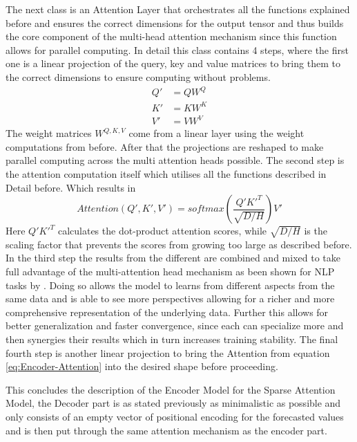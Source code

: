 \documentclass{article}
\begin{document}
The next class is an Attention Layer that orchestrates all the functions explained before and ensures the correct dimensions for the output tensor and thus builds the core component of the multi-head attention mechanism since this function allows for parallel computing. In detail this class contains 4 steps, where the first one is a linear projection of the query, key and value matrices to bring them to the correct dimensions to ensure computing without problems.
\begin{align}
    Q' &= QW^Q \\
    K' &= KW^K \\
    V' &= VW^V
\end{align}
The weight matrices $W^{Q,K,V}$ come from a linear layer using the weight computations from before. After that the projections are reshaped to make parallel computing across the multi attention heads possible. The second step is the attention computation itself which utilises all the functions described in Detail before. Which results in 
\begin{equation}\label{eq:Encoder-Attention}
    Attention(Q', K', V') = softmax \left( \frac{Q'K'^T}{\sqrt{D / H}} \right) V'
\end{equation}
Here $Q'K'^T$ calculates the dot-product attention scores, while $\sqrt{D/H}$ is the scaling factor that prevents the scores from growing too large as described before.  In the third step the results from the different are combined and mixed to take full advantage of the multi-attention head mechanism as been shown for NLP tasks by \cite{multi-head-mixing, mulit-head-mixing2}. Doing so allows the model to learns from different aspects from the same data and is able to see more perspectives allowing for a richer and more comprehensive representation of the underlying data. Further this allows for better generalization and faster convergence, since each can specialize more and then synergies their results which in turn increases training stability. The final fourth step is another linear projection to bring the Attention from equation \ref{eq:Encoder-Attention} into the desired shape before proceeding. \par 

This concludes the description of the Encoder Model for the Sparse Attention Model, the Decoder part is as stated previously as minimalistic as possible and only consists of an empty vector of positional encoding for the forecasted values and is then put through the same attention mechanism as the encoder part.
\end{document}
